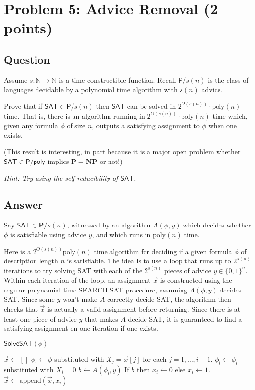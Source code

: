 \documentclass{article}
\renewcommand{\P}{\mathbf{P}}
\newcommand{\NP}{\mathbf{NP}}
\def \N {{\mathbb N}}
\def \poly{\text{poly}}
\begin{document}
\newpage
\section*{Problem 5: Advice Removal (2 points)}

\subsection*{Question}
Assume $s : \N \rightarrow \N$ is a time constructible function. Recall $\mathsf{P}/s(n)$ is the class of languages decidable by a polynomial time algorithm with $s(n)$ advice. 

Prove that if $\textsf{SAT} \in \mathsf{P}/s(n)$ then $\textsf{SAT}$ can be solved in $2^{O(s(n))}\cdot \poly(n)$ time. That is, there is an algorithm running in $2^{O(s(n))}\cdot \poly(n)$ time which, given any formula $\phi$ of size $n$, outputs a satisfying assignment to $\phi$ when one exists.

(This result is interesting, in part because it is a major open problem whether $\textsf{SAT} \in \mathsf{P}/\mathsf{poly}$ implies $\P = \NP$ or not!)

\emph{Hint: Try using the self-reducibility of $\mathsf{SAT}$.}

\subsection*{Answer}

Say $\textsf{SAT} \in \P/s(n)$, witnessed by an algorithm $A(\phi, y)$ which decides whether $\phi$ is satisfiable using advice $y$, and which runs in $\poly(n)$ time.

Here is a $2^{O(s(n))} \poly(n)$ time algorithm for deciding if a given formula $\phi$ of description length $n$ is satisfiable.
The idea is to use a loop that runs up to $2^{s(n)}$ iterations to try solving SAT with each of the $2^{s(n)}$ pieces of advice $y \in \{0, 1\}^n$.
Within each iteration of the loop, an assignment $\vec{x}$ is constructed using the regular polynomial-time SEARCH-SAT procedure, assuming $A(\phi, y)$ decides SAT.
Since some $y$ won't make $A$ correctly decide SAT, the algorithm then checks that $\vec{x}$ is actually a valid assignment before returning.
Since there is at least one piece of advice $y$ that makes $A$ decide SAT, it is guaranteed to find a satisfying assignment on one iteration if one exists.

\begin{algorithm}{$\mathsf{SolveSAT}(\phi)$}
\begin{algorithmic}[1]
		\STATE $\vec{x} \gets []$
			\STATE $\phi_i \gets \phi$ substituted with $X_j = \vec{x}[j]$ for each $j= 1, \dots, i-1$.
			\STATE $\phi_i \gets \phi_i$ substituted with $X_i = 0$
			\STATE $b \gets A(\phi_i, y)$
			\STATE If $b$ then $x_i \gets 0$ else $x_i \gets 1$.
			\STATE $\vec{x} \gets \text{append}(\vec{x}, x_i)$
		\ENDFOR
			 
		\ENDIF
	\ENDFOR
\end{algorithmic}
\end{algorithm}
\end{document}
